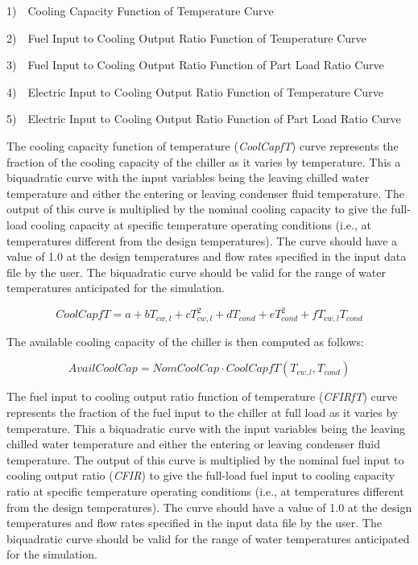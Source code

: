 1)~~Cooling Capacity Function of Temperature Curve

2)~~Fuel Input to Cooling Output Ratio Function of Temperature Curve

3)~~Fuel Input to Cooling Output Ratio Function of Part Load Ratio Curve

4)~~Electric Input to Cooling Output Ratio Function of Temperature Curve

5)~~Electric Input to Cooling Output Ratio Function of Part Load Ratio Curve

The cooling capacity function of temperature (\emph{CoolCapfT}) curve represents the fraction of the cooling capacity of the chiller as it varies by temperature. This a biquadratic curve with the input variables being the leaving chilled water temperature and either the entering or leaving condenser fluid temperature. The output of this curve is multiplied by the nominal cooling capacity to give the full-load cooling capacity at specific temperature operating conditions (i.e., at temperatures different from the design temperatures). The curve should have a value of 1.0 at the design temperatures and flow rates specified in the input data file by the user. The biquadratic curve should be valid for the range of water temperatures anticipated for the simulation.

\begin{equation}
CoolCapfT = a + b{T_{cw,l}} + cT_{cw,l}^2 + d{T_{cond}} + eT_{cond}^2 + f{T_{cw,l}}{T_{cond}}
\end{equation}

The available cooling capacity of the chiller is then computed as follows:

\begin{equation}
AvailCoolCap = NomCoolCap \cdot CoolCapfT({T_{cw,l}},{T_{cond}})
\end{equation}

The fuel input to cooling output ratio function of temperature (\emph{CFIRfT}) curve represents the fraction of the fuel input to the chiller at full load as it varies by temperature. This a biquadratic curve with the input variables being the leaving chilled water temperature and either the entering or leaving condenser fluid temperature. The output of this curve is multiplied by the nominal fuel input to cooling output ratio (\emph{CFIR}) to give the full-load fuel input to cooling capacity ratio at specific temperature operating conditions (i.e., at temperatures different from the design temperatures). The curve should have a value of 1.0 at the design temperatures and flow rates specified in the input data file by the user. The biquadratic curve should be valid for the range of water temperatures anticipated for the simulation.

